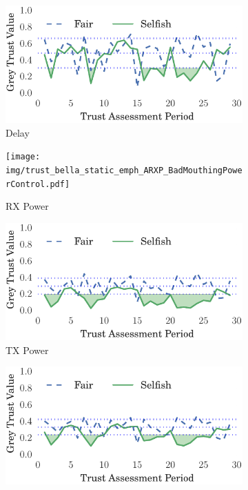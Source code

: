 \documentclass[runningheads,a4paper]{llncs}
\begin{document}
\begin{figure}
\begin{subfigure}{0.32\textwidth}
  \centering
  \includegraphics[width=.95\linewidth]{img/trust_bella_static_emph_ADelay_BadMouthingPowerControl.pdf}
  \caption{Delay}
  \label{fig:static_badmouthing_delay}
\end{subfigure}
\begin{subfigure}{0.32\textwidth}
\centering
  \texttt{[image: img/trust\_bella\_static\_emph\_ARXP\_BadMouthingPowerControl.pdf]}
  \caption{RX Power}
  \label{fig:static_badmouthing_rxp}
\end{subfigure}
\begin{subfigure}{0.32\textwidth}
\centering
  \includegraphics[width=.95\linewidth]{img/trust_bella_static_emph_ATXP_BadMouthingPowerControl.pdf}
  \caption{TX Power}
  \label{fig:static_badmouthing_txp}
\end{subfigure}
\begin{subfigure}{0.32\textwidth}
\centering
  \includegraphics[width=.95\linewidth]{img/trust_bella_static_emph_RXThroughput_BadMouthingPowerControl.pdf}

\end{subfigure}
\end{figure}
\end{document}

